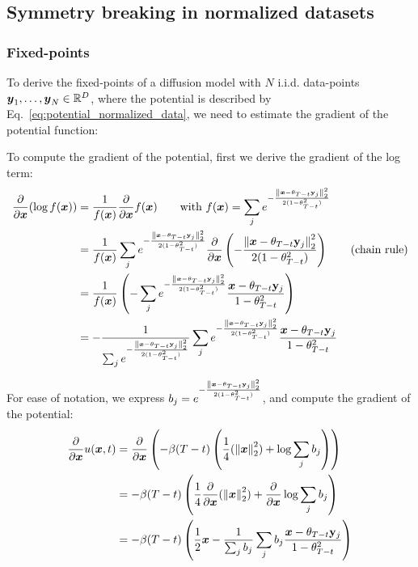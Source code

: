 \subsection{Symmetry breaking in normalized datasets}
\label{supp:normalized_datasets_calculation}


\subsubsection{Fixed-points}
To derive the fixed-points of a diffusion model with $N$ i.i.d. data-points ${\boldsymbol{y}_1, \dots, \boldsymbol{y}_N} \in \mathbb{R}^D$, where the potential is described by Eq.~\ref{eq:potential_normalized_data}, we need to estimate the gradient of the potential function:


To compute the gradient of the potential, first we derive the gradient of the log term:
\begin{align}
    \frac{\partial}{\partial \boldsymbol{x}}(\log f(\boldsymbol{x})) &= \frac{1}{f(\boldsymbol{x})}\frac{\partial}{\partial \boldsymbol{x}}f(\boldsymbol{x}) \quad \quad  \text{with } f(\boldsymbol{x})=\sum_j e^{-\frac{{\left\lVert\boldsymbol{x} - \theta_{T - t}\mathbf{y}_j\right\rVert}_{2}^2}{2 ( 1 - \theta_{T-t}^2)}}\nonumber\\
    &= \frac{1}{f(\boldsymbol{x})}
    \sum_j e^{-\frac{{\left\lVert\boldsymbol{x} - \theta_{T - t}\mathbf{y}_j\right\rVert}_{2}^2}{2 ( 1 - \theta_{T-t}^2)}} \frac{\partial}{\partial \boldsymbol{x}}\left( -\frac{{\left\lVert\boldsymbol{x} -  \theta_{T - t}\mathbf{y}_j\right\rVert}_{2}^2}{2 ( 1 - \theta_{T-t}^2)}\right)\quad \quad \text{(chain rule)}\nonumber\\
    &= \frac{1}{f(\boldsymbol{x})}\left(-\sum_j e^{-\frac{{\left\lVert\boldsymbol{x} -  \theta_{T - t}\mathbf{y}_j\right\rVert}_{2}^2}{2 ( 1 - \theta_{T-t}^2)}} \frac{\boldsymbol{x} -  \theta_{T - t}\mathbf{y}_j}{ 1 - \theta_{T-t}^2}\right) \nonumber\\
    &= -\frac{1}{\sum_j e^{-\frac{{\left\lVert\boldsymbol{x} - \theta_{T - t}\mathbf{y}_j\right\rVert}_{2}^2}{2 ( 1 - \theta_{T-t}^2)}}}\sum_j e^{-\frac{{\left\lVert\boldsymbol{x} -  \theta_{T - t}\mathbf{y}_j\right\rVert}_{2}^2}{2 ( 1 - \theta_{T-t}^2)}} \frac{\boldsymbol{x} -  \theta_{T - t}\mathbf{y}_j}{ 1 - \theta_{T-t}^2}
\end{align}

For ease of notation, we express $b_j=  e^{-\frac{{\left\lVert\boldsymbol{x} -  \theta_{T - t}\mathbf{y}_j\right\rVert}_{2}^2}{2 ( 1 - \theta_{T-t}^2)}}$, and compute the gradient of the potential:
\begin{align}
   \frac{\partial}{\partial\boldsymbol{x}}u(\boldsymbol{x}, t)   &=   \frac{\partial}{\partial \boldsymbol{x}} \left( - \beta(T-t)
 \left(\frac{1}{4} ( {\left\lVert\boldsymbol{x}\right\rVert}_{2}^2 ) +    \log{\sum_j b_j } \right)\right) \nonumber\\
 &= - \beta(T - t) \left( \frac{1}{4}  \frac{\partial}{\partial \boldsymbol{x}}( {\left\lVert\boldsymbol{x}\right\rVert}_{2}^2 ) +    \frac{\partial}{\partial \boldsymbol{x}} \log{\sum_j b_j } \right) \nonumber\\
 &= - \beta(T - t) \left( \frac{1}{2}  \boldsymbol{x}   -\frac{1}{\sum_j b_j}\sum_j b_j \frac{\boldsymbol{x} -  \theta_{T - t}\mathbf{y}_j}{ 1 - \theta_{T-t}^2} \right)
\end{align}


